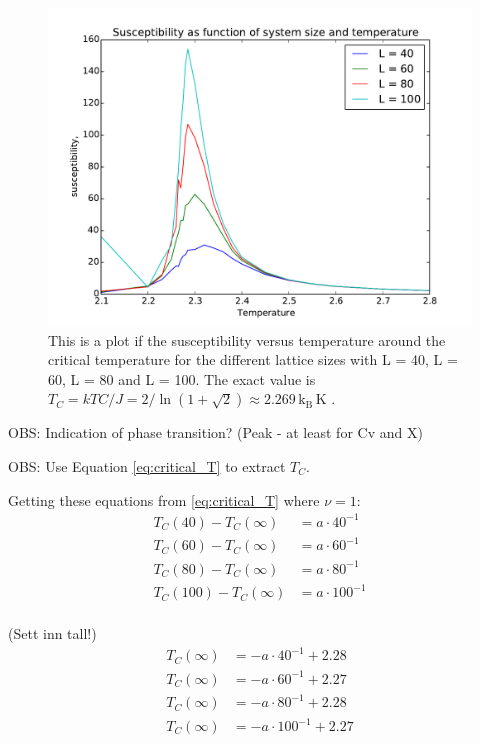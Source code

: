\begin{figure}[H]
\includegraphics[width=\linewidth]{../results/4e/4e_x}\caption{This is a plot if the susceptibility versus temperature around the critical temperature for the different lattice sizes with L = 40, L = 60, L = 80 and L = 100. The exact value is $T_C =  kTC/J = 2/ \ln(1+\sqrt{
2}) \approx 2.269 \,\text{k}_\text{B} \,\text{K}$ \cite{Onsager}.}\label{fig:4e_suscept}
\end{figure}

OBS: Indication of phase transition? (Peak - at least for Cv and X)

OBS: Use Equation \ref{eq:critical_T} to extract $T_C$.

Getting these equations from \ref{eq:critical_T} where $\nu = 1$:
\begin{align*}
T_C(40) - T_C(\infty) &= a \cdot 40^{-1}\\
T_C(60) - T_C(\infty) &= a \cdot 60^{-1}\\
T_C(80) - T_C(\infty) &= a \cdot 80^{-1}\\
T_C(100) - T_C(\infty) &= a \cdot 100^{-1}\\
\end{align*}

(Sett inn tall!)
\begin{align}\label{eq:find_critial_T}
T_C(\infty) &= - a \cdot 40^{-1} + 2.28\\
T_C(\infty) &= - a \cdot 60^{-1} + 2.27\\
T_C(\infty) &= - a \cdot 80^{-1} + 2.28\\
T_C(\infty) &= - a \cdot 100^{-1} + 2.27\label{eq:find_critial_T_end}
\end{align}

